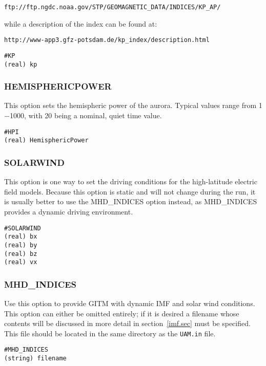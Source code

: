  {\tt ftp://ftp.ngdc.noaa.gov/STP/GEOMAGNETIC\_DATA/INDICES/KP\_AP/} 
 
 \noindent while a description of the index can be found at:
 
 {\tt http://www-app3.gfz-potsdam.de/kp\_index/description.html}

\begin{verbatim}
#KP
(real) kp  
\end{verbatim}

\subsubsection{HEMISPHERICPOWER}
\label{hemisphericpower.sec}

This option sets the hemispheric power of the aurora.  Typical values range from 1$-$1000, with 20 being a nominal, quiet time value.

\begin{verbatim}
#HPI
(real) HemisphericPower
\end{verbatim}

\subsubsection{SOLARWIND}
\label{solarwind.sec}

This option is one way to set the driving conditions for the high-latitude electric field models.  Because this option is static and will not change during the run, it is usually better to use the MHD\_INDICES option instead, as MHD\_INDICES provides a dynamic driving environment.

\begin{verbatim}
#SOLARWIND
(real) bx  
(real) by  
(real) bz  
(real) vx  
\end{verbatim}

\subsubsection{MHD\_INDICES}
\label{mhdindices.sec}

Use this option to provide GITM with dynamic IMF and solar wind conditions.  This option can either be omitted entirely; if it is desired a filename whose contents will be discussed in more detail in section~\ref{imf.sec} must be specified.  This file should be located in the same directory as the {\tt UAM.in} file.

\begin{verbatim}
#MHD_INDICES
(string) filename
\end{verbatim}

